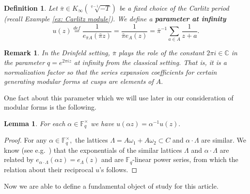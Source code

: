 \documentclass[11pt]{amsart}
\newtheorem{lemma}[theorem]{Lemma}
\newtheorem{definition}[theorem]{Definition}
\newtheorem{remark}[theorem]{Remark}
\theoremstyle{definition}
\newenvironment{psmallmatrix}
{\left(\begin{smallmatrix}}
	{\end{smallmatrix}\right)}
\numberwithin{equation}{section}
\newcommand{\GL}{\mathrm{GL}} 	%
\newcommand{\bbC}{\mathbb{C}}		%
\newcommand{\bbF}{\mathbb{F}}		%
\newcommand{\bbZ}{\mathbb{Z}}		%
\begin{document}
		\begin{definition}\label{d: parameter at infty}
			Let $\overline{\pi}\in K_{\infty}(\sqrt[q-1]{-T})$ be a fixed choice of the Carlitz period (recall Example \ref{ex: Carlitz module}). We define a \textbf{parameter at infinity} 
			\[u(z)\overset{def}{=}\frac{1}{e_{\overline{\pi}A}(\bar{\pi}z)}=\frac{1}{\bar{\pi}e_A(z)}=\bar{\pi}^{-1}\sum_{a\in A}\frac{1}{z+a}.\]
		\end{definition}
		\begin{remark}
			In the Drinfeld setting, $\overline{\pi}$ plays the role of the constant $2\pi i\in \bbC$ in the parameter $q=e^{2\pi i z}$ at infinity from the classical setting. That is, it is a normalization  factor so that the series expansion coefficients for certain generating modular forms at cusps are elements of $A.$ 
		\end{remark}
		
		One fact about this parameter which we will use later in our consideration of modular forms is the following. 
		\begin{lemma}\cite[Page $494$]{Gekeler-survey-Drinfeld-modular-forms}\label{l: u(a/d)=d/au}
			For each $\alpha\in \bbF_q^{\times}$ we have $\displaystyle{u\left(\alpha z\right)=\alpha^{-1}u(z)}.$
		\end{lemma}	
		\begin{proof}
			For any $\alpha \in \bbF_q^{\times},$ the lattices $\Lambda = A\omega_1+A\omega_2\subset C$ and $\alpha\cdot \Lambda$ are similar. We know (see e.g.\ \cite[$(2.2.\mathrm{iv})$]{Gekeler-Curves}) that the exponentials of the similar lattices $\Lambda$ and $\alpha\cdot \Lambda$ are related by $e_{\alpha\cdot\Lambda}(\alpha z)=e_{\Lambda}(z)$ and are $\bbF_q$-linear power series, from which the relation about their reciprocal $u$'s follows. 
			
		\end{proof}
		
		Now we are able to define a fundamental object of study for this article. 
		
\end{document}
